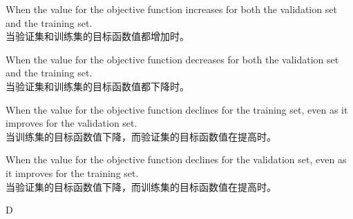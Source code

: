 \documentclass{article}
\begin{document}
        \begin{choices}
            \item When the value for the objective function increases for both the validation set and the training set.\\
            当验证集和训练集的目标函数值都增加时。
            \item When the value for the objective function decreases for both the validation set and the training set.\\
            当验证集和训练集的目标函数值都下降时。
            \item When the value for the objective function declines for the training set, even as it improves for the validation set.\\
            当训练集的目标函数值下降，而验证集的目标函数值在提高时。
            \item When the value for the objective function declines for the validation set, even as it improves for the training set.\\
            当验证集的目标函数值下降，而训练集的目标函数值在提高时。
        \end{choices}
        
        \begin{correctanswer}
        D
        \end{correctanswer}
        
\end{document}
